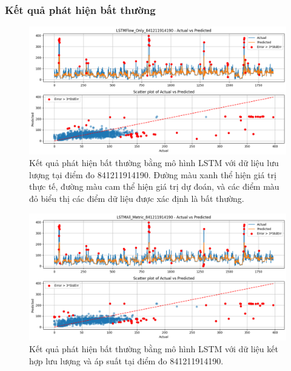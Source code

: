 \subsubsection{Kết quả phát hiện bất thường}

\begin{figure}[H]
    \centering
    \includegraphics[width=\textwidth]{image/section6_3/anomaly_detection_841211914190_lstm_flow.png}
    \caption{Kết quả phát hiện bất thường bằng mô hình LSTM với dữ liệu lưu lượng tại điểm đo 841211914190. Đường màu xanh thể hiện giá trị thực tế, đường màu cam thể hiện giá trị dự đoán, và các điểm màu đỏ biểu thị các điểm dữ liệu được xác định là bất thường.}
    \label{fig:anomaly_lstm_841211914190_flow}
\end{figure}

\begin{figure}[H]
    \centering
    \includegraphics[width=\textwidth]{image/section6_3/anomaly_detection_841211914190_lstm_allmetric.png}
    \caption{Kết quả phát hiện bất thường bằng mô hình LSTM với dữ liệu kết hợp lưu lượng và áp suất tại điểm đo 841211914190.}
    \label{fig:anomaly_lstm_841211914190_all}
\end{figure}

